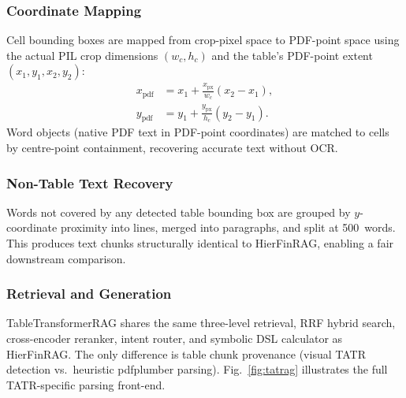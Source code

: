 \documentclass[conference]{IEEEtran}
\begin{document}
\subsubsection{Coordinate Mapping}
Cell bounding boxes are mapped from crop-pixel space to PDF-point space using
the actual PIL crop dimensions $(w_c, h_c)$ and the table's PDF-point extent
$(x_1, y_1, x_2, y_2)$:
\begin{align}
x_{\text{pdf}} &= x_1 + \frac{x_{\text{px}}}{w_c}(x_2 - x_1), \label{eq:xmap}\\
y_{\text{pdf}} &= y_1 + \frac{y_{\text{px}}}{h_c}(y_2 - y_1). \label{eq:ymap}
\end{align}
Word objects (native PDF text in PDF-point coordinates) are matched to cells
by centre-point containment, recovering accurate text without OCR.

\subsubsection{Non-Table Text Recovery}
Words not covered by any detected table bounding box are grouped by
$y$-coordinate proximity into lines, merged into paragraphs, and split at
500~words. This produces text chunks structurally identical to HierFinRAG,
enabling a fair downstream comparison.

\subsubsection{Retrieval and Generation}
TableTransformerRAG shares the same three-level retrieval, RRF hybrid search,
cross-encoder reranker, intent router, and symbolic DSL calculator as
HierFinRAG. The only difference is table chunk provenance (visual TATR
detection vs.\ heuristic pdfplumber parsing). Fig.~\ref{fig:tatrag} illustrates
the full TATR-specific parsing front-end.
\end{document}
